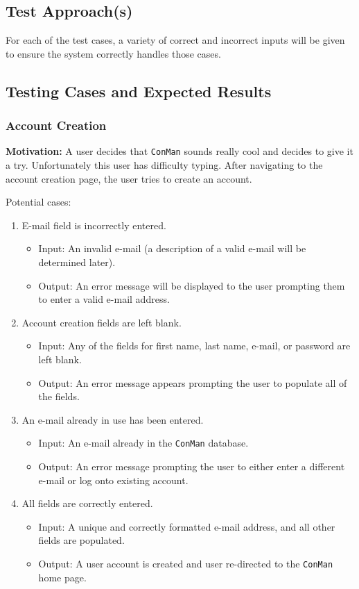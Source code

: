\documentclass{article}
\begin{document}
\subsection{Test Approach(s)}
For each of the test cases, a variety of correct and incorrect inputs will be given to ensure the system correctly handles those cases.


\subsection{Testing Cases and Expected Results}
\subsubsection{Account Creation}
\textbf{Motivation:} A user decides that \texttt{ConMan}
sounds really cool and decides to give it a try. Unfortunately this user has difficulty typing. 
After navigating to the account
creation page, the user tries to create an account.

Potential cases:
\begin{enumerate}
    \item E-mail field is incorrectly entered.
        \begin{itemize}
            \item Input: An invalid e-mail (a description of a valid e-mail
will be determined later).
            \item Output: An error message will be displayed to the user
prompting them to enter a valid e-mail address.
        \end{itemize}
    \item Account creation fields are left blank.
        \begin{itemize}
            \item Input: Any of the fields for first name, last name, e-mail,
or password are left blank.
            \item Output: An error message appears prompting the user to
populate all of the fields.
        \end{itemize}
    \item An e-mail already in use has been entered.
        \begin{itemize}
            \item Input: An e-mail already in the \texttt{ConMan} database.
            \item Output: An error message prompting the user to either enter
a different e-mail or log onto existing account.
        \end{itemize}
    \item All fields are correctly entered.
        \begin{itemize}
            \item Input: A unique and correctly formatted e-mail address, and
all other fields are populated.
            \item Output: A user account is created and user re-directed to
the \texttt{ConMan} home page.
        \end{itemize}
\end{enumerate}
\end{document}
